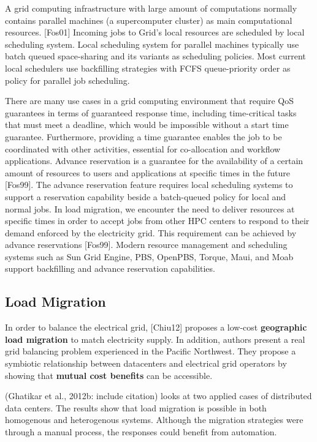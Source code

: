 A grid computing infrastructure with large amount of computations normally
contains parallel machines (a supercomputer cluster) as main computational
resources.  \cite{foster_anatomy_2001} [Fos01]
Incoming jobs to Grid's local resources are scheduled by
local scheduling system. Local scheduling system for parallel machines
typically use batch queued space-sharing and its variants as scheduling
policies. Most current local schedulers use backfilling strategies with FCFS
queue-priority order as policy for parallel job scheduling.

There are many use cases in a grid computing environment that require QoS
guarantees in terms of guaranteed response time, including time-critical
tasks that must meet a deadline, which would be impossible without a start
time guarantee. Furthermore, providing a time guarantee enables the job to be
coordinated with other activities, essential for co-allocation and workflow
applications. Advance reservation is a guarantee for the availability of a
certain amount of resources to users and applications at specific times in
the future 
\cite{foster_distributed_1999} [Fos99]. The advance reservation feature requires local scheduling
systems to support a reservation capability beside a batch-queued policy for
local and normal jobs. In load migration, we encounter the need to deliver
resources at specific times in order to accept jobs from other HPC centers
to respond to their demand enforced by the electricity grid. This requirement
can be achieved by advance reservations 
\cite{foster_distributed_1999}
[Fos99]. Modern resource management
and scheduling systems such as Sun Grid Engine, PBS, OpenPBS, Torque, Maui,
and Moab support backfilling and advance reservation capabilities.

\subsection{Load Migration}

In order to balance the electrical grid,
\cite{chiu_electric_2012}
[Chiu12] proposes a low-cost
\textbf{geographic load migration} to match electricity supply. In addition,
authors present a real grid balancing problem experienced in the Pacific
Northwest. They propose a symbiotic relationship between datacenters and
electrical grid operators by showing that \textbf{mutual cost benefits }can
be accessible.

 (Ghatikar et al., 2012b: include citation) looks at two applied cases of distributed data centers.
 The results show that load migration is possible in both homogenous and heterogenous systems. 
 Although the migration strategies were through a manual process, the responses could benefit from automation.

